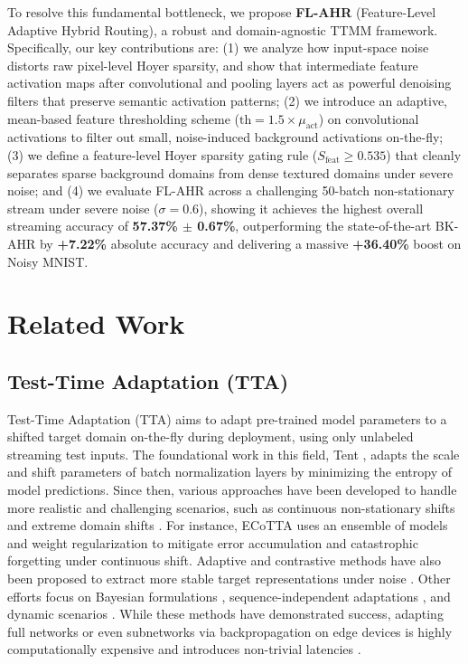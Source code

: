 \documentclass{article}
\theoremstyle{plain}
\theoremstyle{definition}
\theoremstyle{remark}
\begin{document}
To resolve this fundamental bottleneck, we propose \textbf{FL-AHR} (Feature-Level Adaptive Hybrid Routing), a robust and domain-agnostic TTMM framework. Specifically, our key contributions are: (1) we analyze how input-space noise distorts raw pixel-level Hoyer sparsity, and show that intermediate feature activation maps after convolutional and pooling layers act as powerful denoising filters that preserve semantic activation patterns; (2) we introduce an adaptive, mean-based feature thresholding scheme ($\text{th} = 1.5 \times \mu_{\text{act}}$) on convolutional activations to filter out small, noise-induced background activations on-the-fly; (3) we define a feature-level Hoyer sparsity gating rule ($S_{\text{feat}} \ge 0.535$) that cleanly separates sparse background domains from dense textured domains under severe noise; and (4) we evaluate FL-AHR across a challenging 50-batch non-stationary stream under severe noise ($\sigma = 0.6$), showing it achieves the highest overall streaming accuracy of \textbf{57.37\% $\pm$ 0.67\%}, outperforming the state-of-the-art BK-AHR by \textbf{+7.22\%} absolute accuracy and delivering a massive \textbf{+36.40\%} boost on Noisy MNIST.


\section{Related Work}
\label{submission-related-work}

\subsection{Test-Time Adaptation (TTA)}
Test-Time Adaptation (TTA) aims to adapt pre-trained model parameters to a shifted target domain on-the-fly during deployment, using only unlabeled streaming test inputs. The foundational work in this field, Tent \cite{wang2021tent}, adapts the scale and shift parameters of batch normalization layers by minimizing the entropy of model predictions. Since then, various approaches have been developed to handle more realistic and challenging scenarios, such as continuous non-stationary shifts and extreme domain shifts \cite{niu2023towards, yuan2023robust, chen2022contrastive}. For instance, ECoTTA \cite{song2023ecotta} uses an ensemble of models and weight regularization to mitigate error accumulation and catastrophic forgetting under continuous shift. Adaptive and contrastive methods have also been proposed to extract more stable target representations under noise \cite{gong2025adaptive, neff2023realtime}. Other efforts focus on Bayesian formulations \cite{baek2026imse, zhou2025bayesian}, sequence-independent adaptations \cite{xu2025sequenceindependent}, and dynamic scenarios \cite{han2025dynamic, wang2024adaptive, guo2025smoothing}. While these methods have demonstrated success, adapting full networks or even subnetworks via backpropagation on edge devices is highly computationally expensive and introduces non-trivial latencies \cite{lu2025cnngruattention, lv2025potential, shah2021content}.
\end{document}
